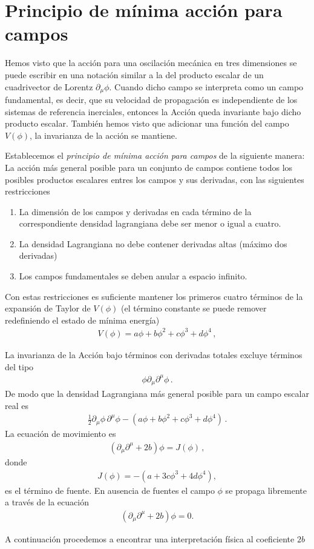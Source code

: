 \section{Principio de mínima acción para campos}
Hemos visto que la acción para una oscilación mecánica en tres dimensiones se puede escribir en una notación similar a la del producto escalar de un cuadrivector de Lorentz $\partial_\mu\phi$. Cuando dicho campo se interpreta como un campo fundamental, es decir, que su velocidad de propagación es independiente de los sistemas de referencia inerciales, entonces la Acción queda invariante bajo dicho producto escalar. También hemos visto que adicionar una función del campo $V(\phi)$, la invarianza de la acción se mantiene.

Establecemos el \emph{principio de mínima acción para campos} de la siguiente manera: La acción más general posible para un conjunto de campos contiene todos los posibles productos escalares entres los campos y sus derivadas, con las siguientes restricciones
\begin{frame}
\begin{enumerate}
\item La dimensión de los campos y derivadas en cada término de la correspondiente densidad lagrangiana debe ser menor o igual a cuatro.
\item La densidad Lagrangiana no debe contener derivadas altas (máximo dos derivadas)
\item Los campos fundamentales se deben anular a espacio infinito.
\end{enumerate}
Con estas restricciones es suficiente mantener los primeros cuatro términos de la expansión de Taylor de $V(\phi)$ (el término constante se puede remover redefiniendo el estado de mínima energía)
\begin{align}
  \label{eq:fullV}
  V(\phi)=a \phi + b\phi^2+c\phi^3+d\phi^4\,,
\end{align}

La invarianza de la Acción bajo términos con derivadas totales excluye términos del tipo
\begin{align}
    \phi\partial_\mu \partial^\mu \phi\,.
\end{align}
De modo que la densidad Lagrangiana más general posible para un campo escalar real es
\begin{align}
  \frac{1}{2}{\partial_\mu\phi}\,{\partial^\mu\phi}-\left( a \phi + b\phi^2+c\phi^3+d\phi^4 \right)\,.
\end{align}
La ecuación de movimiento es
\begin{align}
  \left( \partial_\mu \partial^{\mu} +2b \right)\phi= J(\phi)\,,
\end{align}
donde
\begin{align}
  J(\phi)=- \left( a + 3c\phi^3 + 4d\phi^4 \right),
\end{align}
es el término de fuente. En ausencia de fuentes el campo $\phi$ se propaga libremente a través de la ecuación
\begin{align}
  \left( \partial_\mu \partial^{\mu} +2b \right)\phi= 0.
\end{align}

A continuación procedemos a encontrar una interpretación física al coeficiente $2b$
\end{frame}
